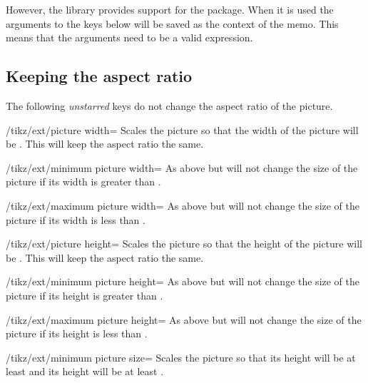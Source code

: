\begin{multicols}{2}
However, the library provides support for the
 \cite{memoize} package.
When it is used the arguments to the keys below
will be saved as the context of the memo.
This means that the arguments need to be a valid
 expression.

\subsection{Keeping the aspect ratio}
The following \emph{unstarred} keys do not change the aspect ratio of the picture.

\begin{key}{/tikz/ext/picture width=}
  Scales the picture so that the width of the picture will be .
  This will keep the aspect ratio the same.
\end{key}

\begin{key}{/tikz/ext/minimum picture width=}
  As above but will not change the size of the picture
  if its width is greater than .
\end{key}

\begin{key}{/tikz/ext/maximum picture width=}
  As above but will not change the size of the picture
  if its width is less than .
\end{key}

\begin{key}{/tikz/ext/picture height=}
  Scales the picture so that the height of the picture will be .
  This will keep the aspect ratio the same.
\end{key}

\begin{key}{/tikz/ext/minimum picture height=}
  As above but will not change the size of the picture
  if its height is greater than .
\end{key}

\begin{key}{/tikz/ext/maximum picture height=}
  As above but will not change the size of the picture
  if its height is less than .
\end{key}

\begin{key}{/tikz/ext/minimum picture size=}
  Scales the picture so that its height will be at least 
  and its height will be at least .
\end{key}


\end{multicols}

